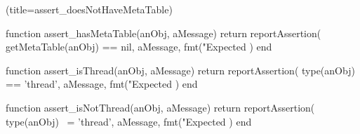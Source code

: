 \stopTestSuite

\startTestSuite(title=assert_doesNotHaveMetaTable)

\startLuaCode
function assert_hasMetaTable(anObj, aMessage)
  return reportAssertion(
    getMetaTable(anObj) == nil,
    aMessage,
    fmt("Expected %
  )
end
\stopLuaCode

\stopTestSuite

\startTestSuite[title=assert_isThread]

\startLuaCode
function assert_isThread(anObj, aMessage)
  return reportAssertion(
    type(anObj) == 'thread',
    aMessage,
    fmt("Expected %
  )
end
\stopLuaCode

\stopTestSuite

\startTestSuite[title=assert_isNotThread]

\startLuaCode
function assert_isNotThread(anObj, aMessage)
  return reportAssertion(
    type(anObj) ~= 'thread',
    aMessage,
    fmt("Expected %
  )
end
\stopLuaCode

\stopTestSuite

\stopchapter